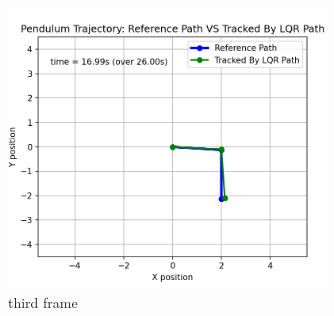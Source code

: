 \documentclass[a4paper,11pt,oneside]{book}
\begin{document}
\begin{figure}[H]
    \centering
    \includegraphics[width=0.75\textwidth]{Screenshot 2025-01-23 191444.png}
    \caption{third frame}
    \label{fig:enter-label}
\end{figure}



\end{document}
